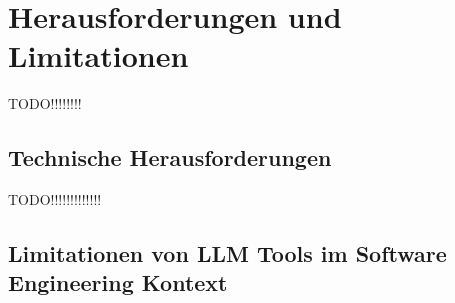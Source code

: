 
\chapter{Herausforderungen und Limitationen} 

TODO!!!!!!!!

\section{Technische Herausforderungen}  \label{Technische Herausforderungen}

TODO!!!!!!!!!!!!!

\section{Limitationen von LLM Tools im Software Engineering Kontext}  \label{Limitationen von LLM Tools im Software Engineering Kontext}

